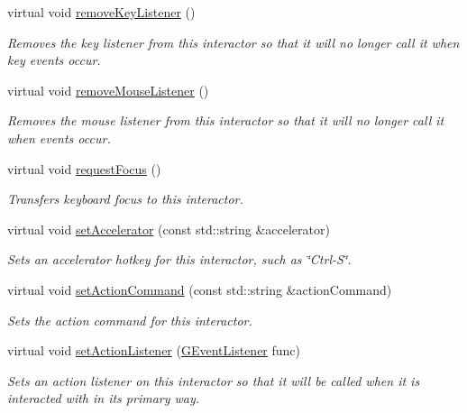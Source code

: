 \begin{DoxyCompactItemize}
virtual void \mbox{\hyperlink{classsgl_1_1GInteractor_a43095f41cab3be732b49f29970484b05}{remove\+Key\+Listener}} ()
\begin{DoxyCompactList}\small\item\em Removes the key listener from this interactor so that it will no longer call it when key events occur. \end{DoxyCompactList}\item 
virtual void \mbox{\hyperlink{classsgl_1_1GInteractor_aff47f71ce47e688a07c9d38dc92fcc11}{remove\+Mouse\+Listener}} ()
\begin{DoxyCompactList}\small\item\em Removes the mouse listener from this interactor so that it will no longer call it when events occur. \end{DoxyCompactList}\item 
virtual void \mbox{\hyperlink{classsgl_1_1GInteractor_a519fb2ac767f8b2febbb50b898b8c8cb}{request\+Focus}} ()
\begin{DoxyCompactList}\small\item\em Transfers keyboard focus to this interactor. \end{DoxyCompactList}\item 
virtual void \mbox{\hyperlink{classsgl_1_1GInteractor_ad15f102f62e2960576012f1aa0ba4b2e}{set\+Accelerator}} (const std\+::string \&accelerator)
\begin{DoxyCompactList}\small\item\em Sets an accelerator hotkey for this interactor, such as \char`\"{}\+Ctrl-\/\+S\char`\"{}. \end{DoxyCompactList}\item 
virtual void \mbox{\hyperlink{classsgl_1_1GInteractor_a4b5843fe3030e038a1ba54cc03389bcf}{set\+Action\+Command}} (const std\+::string \&action\+Command)
\begin{DoxyCompactList}\small\item\em Sets the action command for this interactor. \end{DoxyCompactList}\item 
virtual void \mbox{\hyperlink{classsgl_1_1GInteractor_adcfb4742430c88714fcf57e57ab8ea9c}{set\+Action\+Listener}} (\mbox{\hyperlink{namespacesgl_ae9f3e9eab70035da1a2b114e21357b25}{G\+Event\+Listener}} func)
\begin{DoxyCompactList}\small\item\em Sets an action listener on this interactor so that it will be called when it is interacted with in its primary way. \end{DoxyCompactList}\item 

\end{DoxyCompactItemize}
